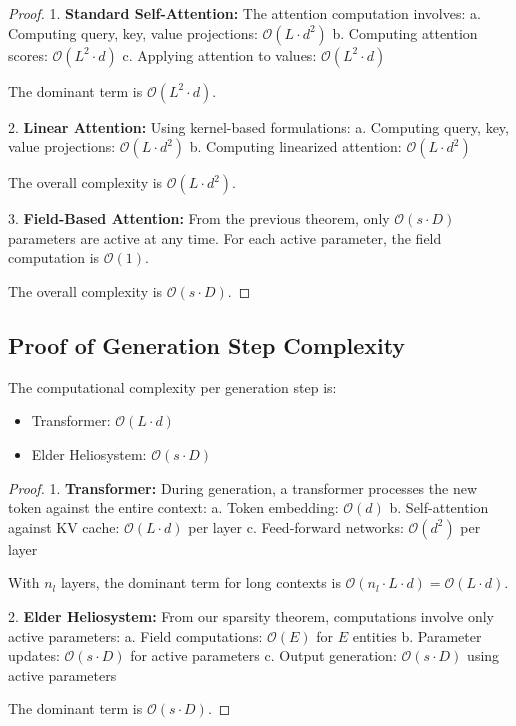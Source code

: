 \begin{proof}
1. \textbf{Standard Self-Attention:}
   The attention computation involves:
   a. Computing query, key, value projections: $\mathcal{O}(L \cdot d^2)$
   b. Computing attention scores: $\mathcal{O}(L^2 \cdot d)$
   c. Applying attention to values: $\mathcal{O}(L^2 \cdot d)$
   
   The dominant term is $\mathcal{O}(L^2 \cdot d)$.

2. \textbf{Linear Attention:}
   Using kernel-based formulations:
   a. Computing query, key, value projections: $\mathcal{O}(L \cdot d^2)$
   b. Computing linearized attention: $\mathcal{O}(L \cdot d^2)$
   
   The overall complexity is $\mathcal{O}(L \cdot d^2)$.

3. \textbf{Field-Based Attention:}
   From the previous theorem, only $\mathcal{O}(s \cdot D)$ parameters are active at any time.
   For each active parameter, the field computation is $\mathcal{O}(1)$.
   
   The overall complexity is $\mathcal{O}(s \cdot D)$.
\end{proof}

\subsection{Proof of Generation Step Complexity}

\begin{theorem}
The computational complexity per generation step is:
\begin{itemize}
    \item Transformer: $\mathcal{O}(L \cdot d)$
    \item Elder Heliosystem: $\mathcal{O}(s \cdot D)$
\end{itemize}
\end{theorem}

\begin{proof}
1. \textbf{Transformer:}
   During generation, a transformer processes the new token against the entire context:
   a. Token embedding: $\mathcal{O}(d)$
   b. Self-attention against KV cache: $\mathcal{O}(L \cdot d)$ per layer
   c. Feed-forward networks: $\mathcal{O}(d^2)$ per layer
   
   With $n_l$ layers, the dominant term for long contexts is $\mathcal{O}(n_l \cdot L \cdot d) = \mathcal{O}(L \cdot d)$.

2. \textbf{Elder Heliosystem:}
   From our sparsity theorem, computations involve only active parameters:
   a. Field computations: $\mathcal{O}(E)$ for $E$ entities
   b. Parameter updates: $\mathcal{O}(s \cdot D)$ for active parameters
   c. Output generation: $\mathcal{O}(s \cdot D)$ using active parameters
   
   The dominant term is $\mathcal{O}(s \cdot D)$.
\end{proof}

